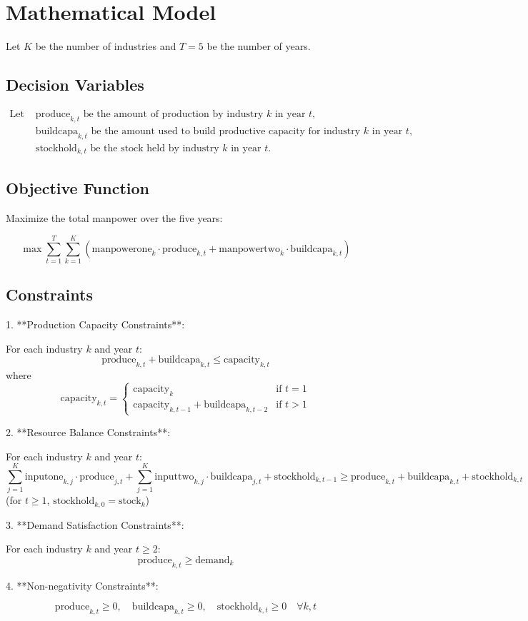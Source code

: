 \documentclass{article}
\begin{document}
\section*{Mathematical Model}

Let \( K \) be the number of industries and \( T = 5 \) be the number of years.

\subsection*{Decision Variables}

\begin{align*}
\text{Let } &\text{produce}_{k,t} \text{ be the amount of production by industry } k \text{ in year } t, \\
&\text{buildcapa}_{k,t} \text{ be the amount used to build productive capacity for industry } k \text{ in year } t, \\
&\text{stockhold}_{k,t} \text{ be the stock held by industry } k \text{ in year } t.
\end{align*}

\subsection*{Objective Function}

Maximize the total manpower over the five years:

\[
\max \sum_{t=1}^{T} \sum_{k=1}^{K} \left( \text{manpowerone}_{k} \cdot \text{produce}_{k,t} + \text{manpowertwo}_{k} \cdot \text{buildcapa}_{k,t} \right)
\]

\subsection*{Constraints}

1. **Production Capacity Constraints**:

For each industry \( k \) and year \( t \):
\[
\text{produce}_{k,t} + \text{buildcapa}_{k,t} \leq \text{capacity}_{k,t}
\]
where
\[
\text{capacity}_{k,t} = 
\begin{cases} 
\text{capacity}_{k} & \text{if } t = 1 \\ 
\text{capacity}_{k,t-1} + \text{buildcapa}_{k,t-2} & \text{if } t > 1 
\end{cases}
\]

2. **Resource Balance Constraints**:

For each industry \( k \) and year \( t \):
\[
\sum_{j=1}^{K} \text{inputone}_{k,j} \cdot \text{produce}_{j,t} + \sum_{j=1}^{K} \text{inputtwo}_{k,j} \cdot \text{buildcapa}_{j,t} + \text{stockhold}_{k,t-1} \geq \text{produce}_{k,t} + \text{buildcapa}_{k,t} + \text{stockhold}_{k,t}
\]
(for \( t \geq 1 \), \(\text{stockhold}_{k,0} = \text{stock}_{k}\))

3. **Demand Satisfaction Constraints**:

For each industry \( k \) and year \( t \geq 2 \):
\[
\text{produce}_{k,t} \geq \text{demand}_{k}
\]

4. **Non-negativity Constraints**:

\[
\text{produce}_{k,t} \geq 0, \quad \text{buildcapa}_{k,t} \geq 0, \quad \text{stockhold}_{k,t} \geq 0 \quad \forall k, t
\]
\end{document}
